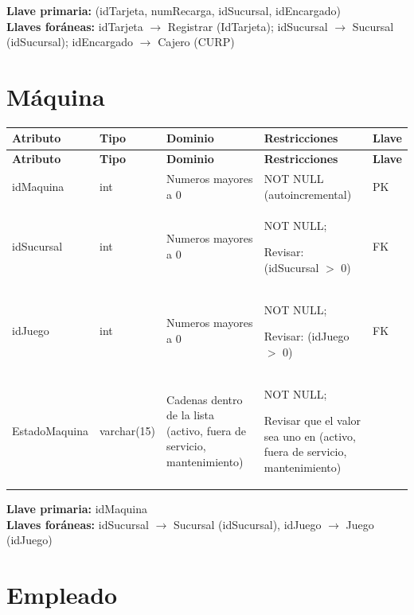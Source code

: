 \documentclass[12pt]{article}
\begin{document}
\textbf{Llave primaria:} (idTarjeta, numRecarga, idSucursal, idEncargado)\\
\textbf{Llaves foráneas:} idTarjeta $\rightarrow$ Registrar (IdTarjeta); idSucursal $\rightarrow$ Sucursal (idSucursal); idEncargado $\rightarrow$ Cajero (CURP)

\section*{Máquina}

\begin{longtable}{p{3.2cm} p{2.2cm} p{4.8cm} p{4.2cm} p{1.2cm}}
\label{tab:maquina}\\
\toprule
\textbf{Atributo} & \textbf{Tipo} & \textbf{Dominio} & \textbf{Restricciones} & \textbf{Llave} \\
\midrule
\endfirsthead

\toprule
\textbf{Atributo} & \textbf{Tipo} & \textbf{Dominio} & \textbf{Restricciones} & \textbf{Llave} \\
\midrule
\endhead

\bottomrule
\endfoot

idMaquina 
& int
& Numeros mayores a 0
& NOT NULL (autoincremental)
& PK \\

idSucursal 
& int 
& Numeros mayores a 0
& NOT NULL; 

Revisar: (idSucursal $>$ 0)
& FK \\

idJuego 
& int 
& Numeros mayores a 0
& NOT NULL; 

Revisar: (idJuego $>$ 0)
& FK \\

EstadoMaquina 
& varchar(15)
& Cadenas dentro de la lista (activo, fuera de servicio, mantenimiento)
& NOT NULL; 

Revisar que el valor sea uno en (activo, fuera de servicio, mantenimiento)
& \\

\end{longtable}

\vspace{2pt}
\textbf{Llave primaria:} idMaquina\\
\textbf{Llaves foráneas:} idSucursal $\rightarrow$ Sucursal (idSucursal), idJuego $\rightarrow$ Juego (idJuego)\\


\section*{Empleado}
\end{document}
